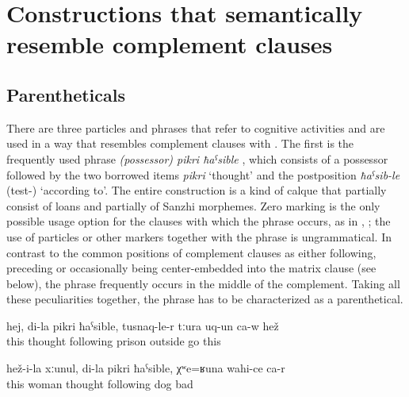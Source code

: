 \section{Constructions that semantically resemble complement clauses}
\label{Constructions that semantically resemble complement clauses}


\subsection{Parentheticals}
\label{ssec:Parentheticals}

There are three particles and phrases that refer to cognitive activities and are used in a way that resembles complement clauses with . The first is the frequently used phrase \textit{(possessor) pikri ħaˁsible} , which consists of a possessor followed by the two borrowed items \textit{pikri} `thought' and the postposition \textit{ħaˁsib-le} (test-) `according to'. The entire construction is a kind of calque that partially consist of loans and partially of Sanzhi morphemes. Zero marking is the only possible usage option for the clauses with which the phrase occurs, as in , ; the use of  particles or other  markers together with the phrase is ungrammatical. In contrast to the common positions of complement clauses as either following, preceding or occasionally being center-embedded into the matrix clause (see  below), the phrase frequently occurs in the middle of the complement. Taking all these peculiarities together, the phrase has to be characterized as a parenthetical. 
%
\begin{exe}
	\ex	\label{ex:‎In my mind, he left prison}
	\gll	hej,	di-la	pikri	ħaˁsible,	tusnaq-le-r	tːura	uq-un	ca-w	hež\\
		this		thought following	prison	outside	go		this\\
	\glt	{}

	\ex	\label{ex:His wife is, in my mind bad like a dog@15}
	\gll	hež-i-la	xːunul,	di-la	pikri	ħaˁsible,	χʷe=ʁuna	wahi-ce	ca-r \\
		this	woman		thought	following	dog	bad	\\
	\glt	{}
\end{exe}

